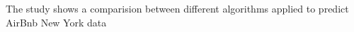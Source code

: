 
The study shows a comparision between different algorithms applied to predict
AirBnb New York data
